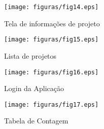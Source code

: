 \begin{apendicesenv}
\begin{figure}[H]
	\centering
	\texttt{[image: figuras/fig14.eps]}
	\caption{Tela de informações de projeto}
	\label{fig14}
\end{figure}

\begin{figure}[H]
	\centering
	\texttt{[image: figuras/fig15.eps]}
	\caption{Lista de projetos}
	\label{fig15}
\end{figure}

\begin{figure}[H]
	\centering
	\texttt{[image: figuras/fig16.eps]}
	\caption{Login da Aplicação}
	\label{fig16}
\end{figure}

\begin{figure}[H]
	\centering
	\texttt{[image: figuras/fig17.eps]}
	\caption{Tabela de Contagem}
	\label{fig17}
\end{figure}


\end{apendicesenv}

